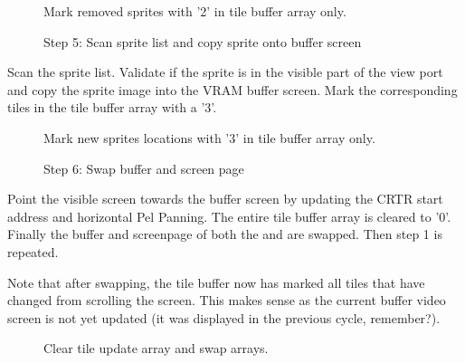 \documentclass[book.tex]{subfiles}
\begin{document}
\begin{figure}[H]
\centering
 \caption{Mark removed sprites with '2' in tile buffer array only.}
 \label{fig:kc1_3_tile_update_remove}
\end{figure}


\pagebreak

\begin{figure}[H]
\centering
 \caption{Step 5: Scan sprite list and copy sprite onto buffer screen}
 \label{fig:kc1_3_update_sprite}
\end{figure}

Scan the sprite list. Validate if the sprite is in the visible part of the view port and copy the sprite image into the VRAM buffer screen. Mark the corresponding tiles in the  tile buffer array with a '3'.

\begin{figure}[H]
\centering
 \caption{Mark new sprites locations with '3' in tile buffer array only.}
 \label{fig:kc1_3_tile_update_sprite}
\end{figure}


\pagebreak


\begin{figure}[H]
\centering
 \caption{Step 6: Swap buffer and screen page}
 \label{fig:kc1_3_update_final}
\end{figure}


Point the visible screen towards the buffer screen by updating the CRTR start address and horizontal Pel Panning. The entire tile buffer array is cleared to '0'. Finally the buffer and screenpage of both the  and  are swapped. Then step 1 is repeated. \\
\par
Note that after swapping, the tile buffer now has marked all tiles that have changed from scrolling the screen. This makes sense as the current buffer video screen is not yet updated (it was displayed in the previous cycle, remember?). 

\begin{figure}[H]
\centering
 \caption{Clear tile update array and swap arrays.}
 \label{fig:kc1_3_tile_final}
\end{figure}


\pagebreak
\end{document}
